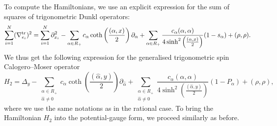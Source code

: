\documentclass[12pt]{amsart}
\numberwithin{equation}{section}
\theoremstyle{definition}
\begin{document}
To compute the Hamiltonians, we use an explicit expression for the sum of squares of trigonometric Dunkl operators:
\begin{equation*}
    \sum\limits_{i = 1}^N (\nabla^{\rm tr}_{e_i})^2 = \sum\limits_{i = 1}^N \partial_{x_i}^2 - \sum\limits_{\alpha \in R_+} c_{\alpha} \coth\left(\frac{(\alpha,x)}{2}\right)\partial_{\alpha} + \sum\limits_{\alpha \in R_+} \frac{c_{\alpha}(\alpha, \alpha)}{4 \sinh^2\left(\frac{(\alpha, x)}{2}\right)}(1 - s_{\alpha}) + (\rho, \rho).
\end{equation*}
We thus get the following expression for the generalised trigonometric spin Calogero--Moser operator
\begin{equation}
\label{trigham}
    H_2 = \Delta_y - \sum\limits_{\substack{\alpha \in R_+ \\ \widehat{\alpha} \neq 0}} c_{\alpha} \coth\left(\frac{(\widehat{\alpha}, y)}{2}\right) \partial_{\widehat{\alpha}} + \sum\limits_{\substack{\alpha \in R_+ \\ \widehat{\alpha} \neq 0}} \frac{c_{\alpha} (\alpha, \alpha)}{4 \sinh^2 \left(\frac{(\widehat{\alpha},y)}{2}\right)}(1 - P_{\alpha}) + (\rho, \rho),
\end{equation}
where we use the same notations as in the rational case. 
To bring the Hamiltonian $H_2$ into the potential-gauge form, we proceed similarly as before.
\end{document}
